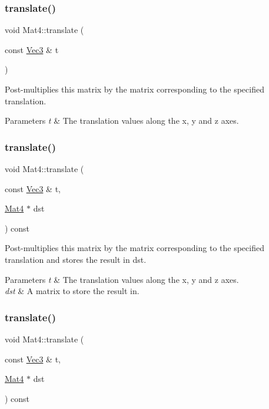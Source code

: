 \subsubsection{\texorpdfstring{translate()}{translate()}\hspace{0.1cm}{\footnotesize\ttfamily [6/8]}}
{\footnotesize\ttfamily void Mat4\+::translate (\begin{DoxyParamCaption}\item[{const \hyperlink{classVec3}{Vec3} \&}]{t }\end{DoxyParamCaption})}

Post-\/multiplies this matrix by the matrix corresponding to the specified translation.


\begin{DoxyParams}{Parameters}
{\em t} & The translation values along the x, y and z axes. \\
\hline
\end{DoxyParams}
\mbox{\label{classMat4_a7022f7bcb5a6b22d7fa86cfe908c6d91}} 
\subsubsection{\texorpdfstring{translate()}{translate()}\hspace{0.1cm}{\footnotesize\ttfamily [7/8]}}
{\footnotesize\ttfamily void Mat4\+::translate (\begin{DoxyParamCaption}\item[{const \hyperlink{classVec3}{Vec3} \&}]{t,  }\item[{\hyperlink{classMat4}{Mat4} $\ast$}]{dst }\end{DoxyParamCaption}) const}

Post-\/multiplies this matrix by the matrix corresponding to the specified translation and stores the result in dst.


\begin{DoxyParams}{Parameters}
{\em t} & The translation values along the x, y and z axes. \\
\hline
{\em dst} & A matrix to store the result in. \\
\hline
\end{DoxyParams}
\mbox{\label{classMat4_a7022f7bcb5a6b22d7fa86cfe908c6d91}} 
\subsubsection{\texorpdfstring{translate()}{translate()}\hspace{0.1cm}{\footnotesize\ttfamily [8/8]}}
{\footnotesize\ttfamily void Mat4\+::translate (\begin{DoxyParamCaption}\item[{const \hyperlink{classVec3}{Vec3} \&}]{t,  }\item[{\hyperlink{classMat4}{Mat4} $\ast$}]{dst }\end{DoxyParamCaption}) const}

